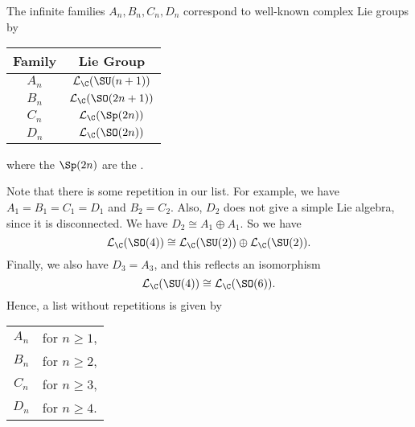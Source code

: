 \documentclass[a4paper]{article}
\begin{document}
\begin{thm}
\begin{center}
  \end{center}
  \begin{center}
  \end{center}
\end{thm}

\begin{eg}
  The infinite families $A_n, B_n, C_n, D_n$ correspond to well-known complex Lie groups by
  \begin{center}
    \begin{tabular}{cc}
      \toprule
      Family & Lie Group\\
      \midrule
      $A_n$ & $\mathcal{L}_\C(\SU(n + 1))$\\
      $B_n$ & $\mathcal{L}_\C(\SO(2n + 1))$\\
      $C_n$ & $\mathcal{L}_\C (\Sp(2n))$\\
      $D_n$ & $\mathcal{L}_\C (\SO(2n))$\\
      \bottomrule
    \end{tabular}
  \end{center}
  where the $\Sp(2n)$ are the .
\end{eg}

Note that there is some repetition in our list. For example, we have $A_1 = B_1 = C_1 = D_1$ and $B_2 = C_2$. Also, $D_2$ does not give a simple Lie algebra, since it is disconnected. We have $D_2 \cong A_1 \oplus A_1$. So we have
\[
  \mathcal{L}_\C(\SO(4)) \cong \mathcal{L}_\C(\SU(2)) \oplus \mathcal{L}_\C(\SU(2)).
\]
Finally, we also have $D_3 = A_3$, and this reflects an isomorphism
\[
  \mathcal{L}_\C(\SU(4)) \cong \mathcal{L}_\C(\SO(6)).
\]
Hence, a list without repetitions is given by
\begin{center}
  \begin{tabular}{cl}
    $A_n$ & for $n\geq 1$,\\
    $B_n$ & for $n\geq 2$,\\
    $C_n$ & for $n\geq 3$,\\
    $D_n$ & for $n\geq 4$.
  \end{tabular}
\end{center}
\end{document}
